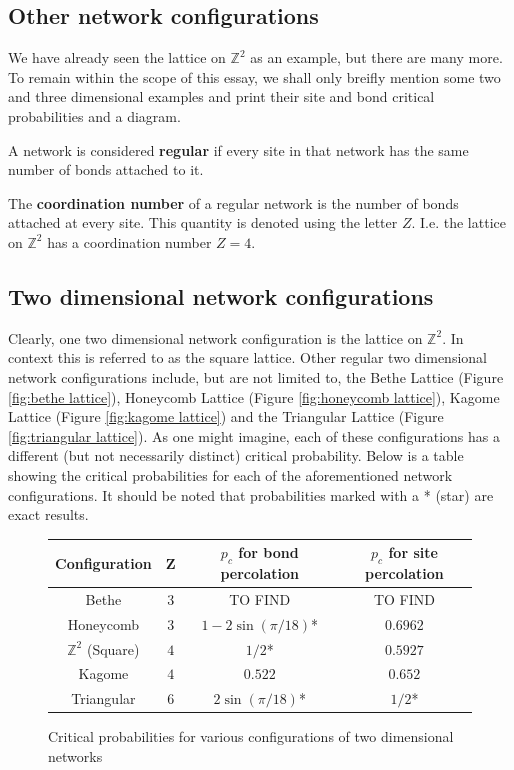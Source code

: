 \subsection{Other network configurations}
We have already seen the lattice on $\mathbb{Z}^2$ as an example, but there are many more. To remain within the scope of this essay, we shall only breifly mention some two and
three dimensional examples and print their site and bond critical probabilities and a diagram.

\begin{definition}
  A network is considered \textbf{regular} if every site in that network has the same number of bonds attached to it.
\end{definition}

\begin{definition}
  The \textbf{coordination number} of a regular network is the number of bonds attached at every site. This quantity is denoted using the letter $Z$. I.e. the lattice on
  $\mathbb{Z}^2$ has a coordination number $Z = 4$. 
\end{definition}

\subsection*{Two dimensional network configurations}
Clearly, one two dimensional network configuration is the lattice on $\mathbb{Z}^2$. In context this is referred to as the square lattice. Other regular two dimensional network configurations include, but are not limited to, the Bethe Lattice (Figure \ref{fig:bethe lattice}), Honeycomb
Lattice (Figure \ref{fig:honeycomb lattice}), Kagome Lattice (Figure \ref{fig:kagome lattice}) and the Triangular Lattice (Figure \ref{fig:triangular lattice}). As one might
imagine, each of these configurations has a different (but not necessarily distinct) critical probability. Below is a table showing the critical probabilities for each of the
aforementioned network configurations. It should be noted that probabilities marked with a * (star) are exact results.

\begin{figure}[h!]
\begin{center}
\begin{tabular}{| c | c | c | c |}
    \hline
    Configuration & Z & $p_c$ for bond percolation & $p_c$ for site percolation \\
    \hline
    Bethe & $3$ & TO FIND & TO FIND \\
    Honeycomb & $3$ & $1 - 2\sin(\pi/18)$* & $0.6962$ \\
    $\mathbb{Z}^2$ (Square) & $4$ & $1/2$* & $0.5927$ \\
    Kagome & $4$ & $0.522$ & $0.652$ \\
    Triangular & $6$ & $2\sin(\pi/18)$* & $1/2$* \\
    \hline
  \end{tabular}
\end{center}
\centering
\caption{Critical probabilities for various configurations of two dimensional networks\cite[p. 11]{Sahimi}}
\label{fig:critical probabilities in two dimensions}
\end{figure}

